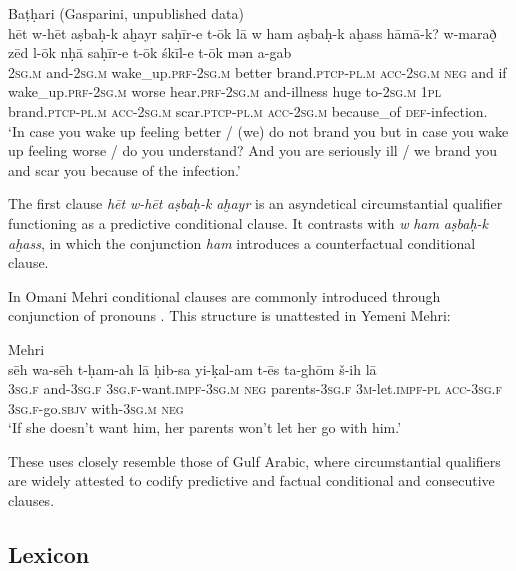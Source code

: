 \documentclass[output=paper]{langsci/langscibook}
\begin{document}
\ea\label{ex:key:het}
{Baṭḥari (Gasparini, unpublished data)}\\
\gll hēt w-hēt aṣbaḥ-k aḫayr saḥīr-e t-ōk lā w ham aṣbaḥ-k aḫass hāmā-k? w-marað̣ zēd l-ōk nḥā saḥīr-e t-ōk śkīl-e t-ōk mən a-gab\\
     \textsc{2sg.m} and-\textsc{2sg.m} wake\_up\textsc{.prf}-\textsc{2sg.m} better brand.\textsc{ptcp-pl.m} \textsc{acc-2sg.m} \textsc{neg} and if wake\_up.\textsc{prf-2sg.m} worse hear.\textsc{prf-2sg.m} and-illness huge to-\textsc{2sg.m} \textsc{1pl} brand.\textsc{ptcp-pl.m} \textsc{acc-2sg.m} scar.\textsc{ptcp-pl.m} \textsc{acc-2sg.m} because\_of \textsc{def}-infection.\\
\glt `In case you wake up feeling better / (we) do not brand you but in case you wake up feeling worse / do you understand? And you are seriously ill / we brand you and scar you because of the infection.'
\z

The first clause \textit{hēt} \textit{w-hēt} \textit{aṣbaḥ-k } \textit{aḫayr} is an asyndetical circumstantial qualifier functioning as a predictive conditional clause. It contrasts with \textit{w} \textit{ham} \textit{aṣbaḥ-k} \textit{aḫass}, in which the conjunction \textit{ham} introduces a counterfactual conditional clause. 

In Omani Mehri conditional clauses are commonly introduced through conjunction of pronouns \citep[211]{WatsonAl-Mahriforthcoming}. This structure is unattested in Yemeni Mehri:

\ea\label{ex:key:}
{Mehri \citep[211]{WatsonAl-Mahriforthcoming}}\\
\gll     sēh wa-sēh t-ḥam-ah lā ḥib-sa yi-ḳal-am t-ēs ta-ghōm š-ih lā\\
     \textsc{3sg.f} and-\textsc{3sg.f} \textsc{3sg.f}{}-want.\textsc{impf-3sg.m} \textsc{neg} parents-\textsc{3sg.f} \textsc{3m}-let.\textsc{impf-pl} \textsc{acc-3sg.f} \textsc{3sg.f}-go.\textsc{sbjv} with-\textsc{3sg.m} \textsc{neg}\\
\glt  `If she doesn’t want him, her parents won’t let her go with him.'\\
\z
     
These uses closely resemble those of Gulf Arabic, where circumstantial qualifiers are widely attested to codify predictive and factual conditional and consecutive clauses.


 
 \subsection{Lexicon}\label{sec:key:lex}
\end{document}
